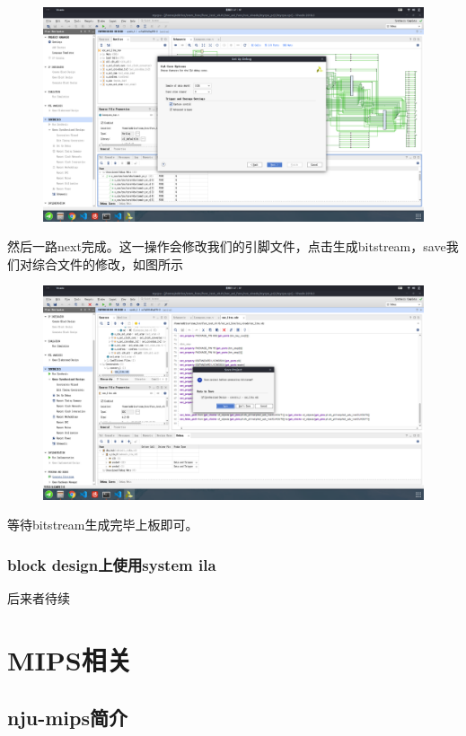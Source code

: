 \documentclass[lang=cn,11pt,a4paper]{elegantpaper}
\begin{document}
\begin{figure}[H]
\centering
\includegraphics[width=\linewidth]{image/mark_debug_3.png}
\end{figure}
然后一路next完成。这一操作会修改我们的引脚文件，点击生成bitstream，save我们对综合文件的修改，如图所示
\begin{figure}[H]
\centering
\includegraphics[width=\linewidth]{image/mark_debug_4.png}
\end{figure}
等待bitstream生成完毕上板即可。

\subsubsection{block design上使用system ila}

后来者待续

\section{MIPS相关}

\subsection{nju-mips简介}
\end{document}
